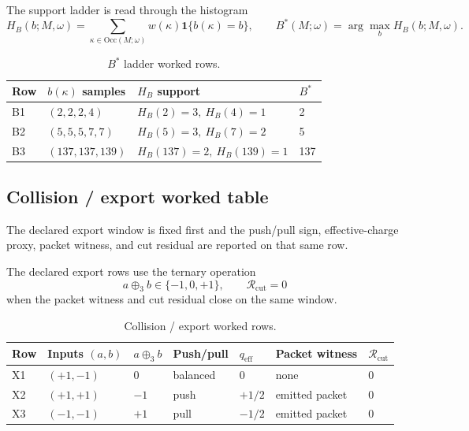 The support ladder is read through the histogram
\[
H_B(b;M,\omega)=\sum_{\kappa\in\mathrm{Occ}(M;\omega)}w(\kappa)\mathbf 1\{b(\kappa)=b\},
\qquad
B^*(M;\omega)=\arg\max_b H_B(b;M,\omega).
\]

\begin{table}[H]
\centering
\caption{$B^*$ ladder worked rows.}
\label{tab:manual-bstar-ladder}
\begin{threeparttable}
\small
\begin{tabular}{@{}llll@{}}
\toprule
Row & $b(\kappa)$ samples & $H_B$ support & $B^*$ \\
\midrule
B1 & $(2,2,2,4)$ & $H_B(2)=3,\ H_B(4)=1$ & 2 \\
B2 & $(5,5,5,7,7)$ & $H_B(5)=3,\ H_B(7)=2$ & 5 \\
B3 & $(137,137,139)$ & $H_B(137)=2,\ H_B(139)=1$ & 137 \\
\bottomrule
\end{tabular}
\end{threeparttable}
\end{table}

\subsection{Collision / export worked table}
\label{man:collision-export-worked-table}
The declared export window is fixed first and the push/pull sign, effective-charge proxy, packet witness, and cut residual are reported on that same row.\par\smallskip
{}

The declared export rows use the ternary operation
\[
a\oplus_3 b\in\{-1,0,+1\},
\qquad
\mathcal R_{\mathrm{cut}}=0
\]
when the packet witness and cut residual close on the same window.

\begin{table}[H]
\centering
\caption{Collision / export worked rows.}
\label{tab:manual-collision-export}
\begin{threeparttable}
\small
\begin{tabular}{@{}lllllll@{}}
\toprule
Row & Inputs $(a,b)$ & $a\oplus_3 b$ & Push/pull & $q_{\mathrm{eff}}$ & Packet witness & $\mathcal R_{\mathrm{cut}}$ \\
\midrule
X1 & $(+1,-1)$ & $0$ & balanced & $0$ & none & $0$ \\
X2 & $(+1,+1)$ & $-1$ & push & $+1/2$ & emitted packet & $0$ \\
X3 & $(-1,-1)$ & $+1$ & pull & $-1/2$ & emitted packet & $0$ \\
\bottomrule
\end{tabular}
\end{threeparttable}
\end{table}

